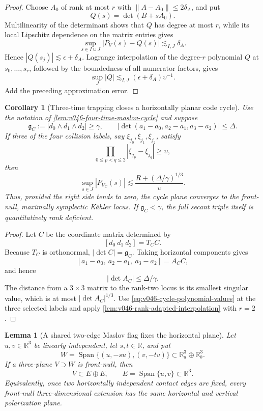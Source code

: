 \documentclass[10pt]{article}
\newtheorem{lemma}[theorem]{Lemma}
\newtheorem{corollary}[theorem]{Corollary}
\newcommand{\R}{\mathbb R}
\newcommand{\Span}{\operatorname{Span}}
\begin{document}
\begin{proof}
Choose \(A_0\) of rank at most \(r\) with \(\|A-A_0\|\le2\delta_A\), and put
\[
Q(s)=\det(B+sA_0).
\]
Multilinearity of the determinant shows that \(Q\) has degree at most \(r\), while its local
Lipschitz dependence on the matrix entries gives
\[
\sup_{s\in I\cup J}|P_V(s)-Q(s)|
\lesssim_{I,J}\delta_A.
\]
Hence \(|Q(s_j)|\lesssim\epsilon+\delta_A\).  Lagrange interpolation of the degree-\(r\)
polynomial \(Q\) at \(s_0,\ldots,s_r\), followed by the boundedness of all numerator factors,
gives
\[
\sup_J|Q|
\lesssim_{I,J}
(\epsilon+\delta_A)\upsilon^{-1}.
\]
Add the preceding approximation error.
\end{proof}

\begin{corollary}[Three-time trapping closes a horizontally planar code cycle]
\label{cor:v046-three-time-planar-cycle}
Use the notation of \cref{lem:v046-four-time-maslov-cycle} and suppose
\[
\mathfrak g_C:=|d_0\wedge d_1\wedge d_2|\ge\gamma,
\qquad
\left|\det(a_1-a_0,a_2-a_1,a_3-a_2)\right|\le\Delta.
\]
If three of the four collision labels, say \(\xi_{j_0},\xi_{j_1},\xi_{j_2}\), satisfy
\[
\prod_{0\le p<q\le2}|\xi_{j_p}-\xi_{j_q}|
\ge\upsilon,
\]
then
\begin{equation}
\label{eq:v046-three-time-planar-cycle}
\boxed{
\sup_{s\in J}|P_{V_C}(s)|
\lesssim
\frac{R+(\Delta/\gamma)^{1/3}}{\upsilon}.
}
\end{equation}
Thus, provided the right side tends to zero, the cycle plane converges to the front-null,
maximally symplectic K\"ahler locus.  If \(\mathfrak g_C<\gamma\), the full secant triple itself is
quantitatively rank deficient.
\end{corollary}

\begin{proof}
Let \(C\) be the coordinate matrix determined by
\[
[d_0\ d_1\ d_2]=T_CC.
\]
Because \(T_C\) is orthonormal, \(|\det C|=\mathfrak g_C\).  Taking horizontal components gives
\[
[a_1-a_0,\ a_2-a_1,\ a_3-a_2]=A_CC,
\]
and hence
\[
|\det A_C|
\le
\Delta/\gamma.
\]
The distance from a \(3\times3\) matrix to the rank-two locus is its smallest singular value, which
is at most \(|\det A_C|^{1/3}\).  Use
\eqref{eq:v046-cycle-polynomial-values} at the three selected labels and apply
\cref{lem:v046-rank-adapted-interpolation} with \(r=2\).
\end{proof}

\begin{lemma}[A shared two-edge Maslov flag fixes the horizontal plane]
\label{lem:v046-shared-two-edge-flag}
Let \(u,v\in\R^3\) be linearly independent, let \(s,t\in\R\), and put
\[
W
=
\Span\{(u,-su),(v,-tv)\}
\subset\R_a^3\oplus\R_b^3.
\]
If a three-plane \(V\supset W\) is front-null, then
\begin{equation}
\label{eq:v046-shared-flag-plane}
\boxed{
V
\subset
E\oplus E,
\qquad
E=\Span\{u,v\}\subset\R^3.
}
\end{equation}
Equivalently, once two horizontally independent contact edges are fixed, every front-null
three-dimensional extension has the same horizontal and vertical polarization plane.
\end{lemma}
\end{document}
